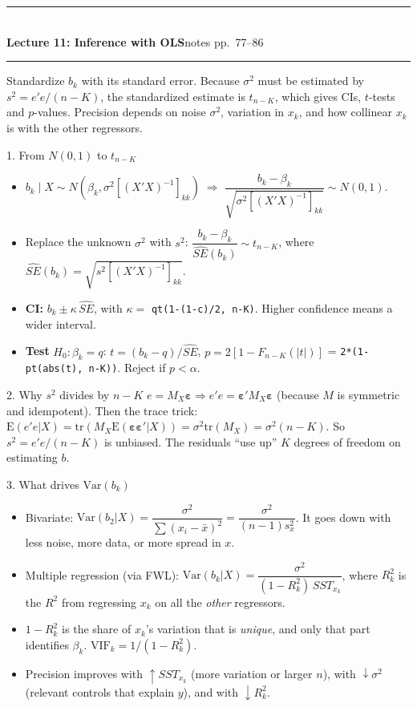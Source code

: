 \documentclass[10pt]{article}
\newcommand{\E}{\mathrm{E}}
\newcommand{\Var}{\mathrm{Var}}
\newcommand{\tr}{\mathrm{tr}}
\newcommand{\veps}{\bm{\varepsilon}}
\newcommand{\lec}[3]{%
  {\color{ink}\rule{\linewidth}{1.2pt}}\\[-2pt]
  {\Large\bfseries\color{ink} Lecture #1: #2}\hfill{\small\color{gray}#3}\\[-6pt]
  {\color{ink}\rule{\linewidth}{0.4pt}}\par\vspace{2pt}}
\begin{document}
\newpage
\lec{11}{Inference with OLS}{notes pp.\ 77--86}

\begin{bigidea}
Standardize $b_k$ with its standard error. Because $\sigma^2$ must be estimated by $s^2=e'e/(n-K)$, the standardized estimate is $t_{n-K}$, which gives CIs, $t$-tests and $p$-values. Precision depends on noise $\sigma^2$, variation in $x_k$, and how collinear $x_k$ is with the other regressors.
\end{bigidea}

\begin{topic}{1. From $N(0,1)$ to $t_{n-K}$}
\begin{itemize}
\item $b_k\mid X\sim N(\beta_k,\sigma^2[(X'X)^{-1}]_{kk})\;\Rightarrow\;\dfrac{b_k-\beta_k}{\sqrt{\sigma^2[(X'X)^{-1}]_{kk}}}\sim N(0,1)$.
\item Replace the unknown $\sigma^2$ with $s^2$: $\dfrac{b_k-\beta_k}{\widehat{SE}(b_k)}\sim t_{n-K}$, where $\widehat{SE}(b_k)=\sqrt{s^2[(X'X)^{-1}]_{kk}}$.
\item \textbf{CI:} $b_k\pm\kappa\,\widehat{SE}$, with $\kappa=$ \texttt{qt(1-(1-c)/2, n-K)}. Higher confidence means a wider interval.
\item \textbf{Test} $H_0:\beta_k=q$: $t=(b_k-q)/\widehat{SE}$, $p=2[1-F_{n-K}(|t|)]$ = \texttt{2*(1-pt(abs(t), n-K))}. Reject if $p<\alpha$.
\end{itemize}
\end{topic}

\begin{topic}{2. Why $s^2$ divides by $n-K$}
$e=M_X\veps \Rightarrow e'e=\veps'M_X\veps$ (because $M$ is symmetric and idempotent). Then the trace trick: $\E(e'e|X)=\tr(M_X\E(\veps\veps'|X))=\sigma^2\tr(M_X)=\sigma^2(n-K)$. So $s^2=e'e/(n-K)$ is unbiased. The residuals ``use up'' $K$ degrees of freedom on estimating $b$.
\end{topic}

\begin{topic}{3. What drives $\Var(b_k)$}
\begin{itemize}
\item Bivariate: $\Var(b_2|X)=\dfrac{\sigma^2}{\sum(x_i-\bar x)^2}=\dfrac{\sigma^2}{(n-1)s_x^2}$. It goes down with less noise, more data, or more spread in $x$.
\item Multiple regression (via FWL): $\boxed{\Var(b_k|X)=\dfrac{\sigma^2}{(1-R_k^2)\,SST_{x_k}}}$, where $R_k^2$ is the $R^2$ from regressing $x_k$ on all the \emph{other} regressors.
\item $1-R_k^2$ is the share of $x_k$'s variation that is \emph{unique}, and only that part identifies $\beta_k$. $\mathrm{VIF}_k=1/(1-R_k^2)$.
\item Precision improves with $\uparrow SST_{x_k}$ (more variation or larger $n$), with $\downarrow\sigma^2$ (relevant controls that explain $y$), and with $\downarrow R_k^2$.
\end{itemize}
\end{topic}
\end{document}
